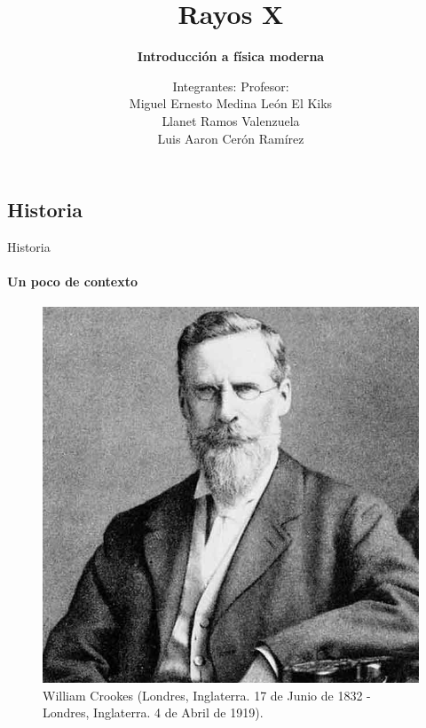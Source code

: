 \documentclass{beamer}
\title{\hspace{45mm} Rayos X} %
\subtitle{\textbf{Introducci\'on a f\'isica moderna}} %
\author{Integrantes: \hspace{65mm}Profesor:\\Miguel Ernesto Medina Le\'on \hspace{40mm} El Kiks \\Llanet Ramos Valenzuela\\Luis Aaron Cer\'on Ram\'irez}
\begin{document}
  \frame{\maketitle}


  \begin{darkframes} %
    \section{Historia} %
    \begin{frame}{Historia} %
      \framesubtitle{Un poco de contexto} %
     \begin{multicols}{2}
     \begin{figure}
         \centering
         \includegraphics[width = 0.85 \linewidth]{resources/1f.jpg}
         \caption{William Crookes (Londres, Inglaterra. 17 de Junio de 1832 - Londres, Inglaterra. 4 de Abril de 1919).}
         \label{fig:my_label}
     \end{figure}
     

\end{multicols}
\end{frame}
\end{darkframes}
\end{document}
